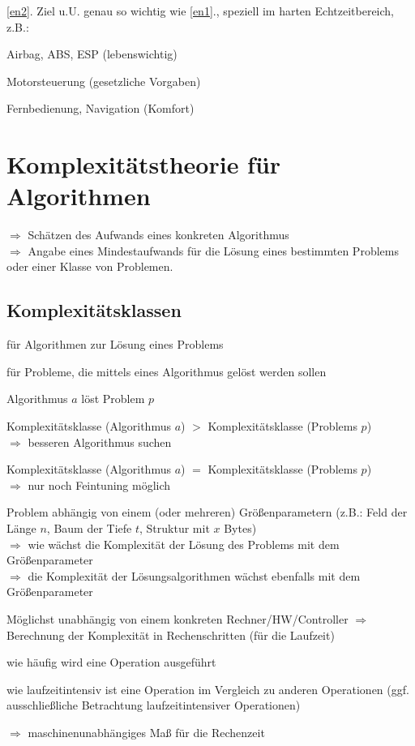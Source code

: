 \ref*{en2}. Ziel u.U. genau so wichtig wie \ref*{en1}., speziell im harten Echtzeitbereich, z.B.:
\begin{compactitem}
	\item Airbag, ABS, ESP (lebenswichtig)
	\item Motorsteuerung (gesetzliche Vorgaben)
	\item Fernbedienung, Navigation (Komfort)
\end{compactitem}

\section{Komplexitätstheorie für Algorithmen}
$\Rightarrow$ Schätzen des Aufwands eines konkreten Algorithmus\\
$\Rightarrow$ Angabe eines Mindestaufwands für die Lösung eines bestimmten Problems oder einer Klasse von Problemen.

\subsection{Komplexitätsklassen}
\begin{compactitem}
	\item für Algorithmen zur Lösung eines Problems
	\item für Probleme, die mittels eines Algorithmus gelöst werden sollen
\end{compactitem}

Algorithmus $a$ löst Problem $p$
\begin{compactitem}
	\item Komplexitätsklasse (Algorithmus $a$) $>$ Komplexitätsklasse (Problems $p$)\\
	$\Rightarrow$ besseren Algorithmus suchen
	\item Komplexitätsklasse (Algorithmus $a$) $=$ Komplexitätsklasse (Problems $p$)\\
	$\Rightarrow$ nur noch Feintuning möglich
\end{compactitem}

Problem abhängig von einem (oder mehreren) Größenparametern (z.B.: Feld der Länge $n$, Baum der Tiefe $t$, Struktur mit $x$ Bytes)\\
$\Rightarrow$ wie wächst die Komplexität der Lösung des Problems mit dem Größenparameter\\
$\Rightarrow$ die Komplexität der Lösungsalgorithmen wächst ebenfalls mit dem Größenparameter

Möglichst unabhängig von einem konkreten Rechner/HW/Controller
$\Rightarrow$ Berechnung der Komplexität in Rechenschritten (für die Laufzeit)
\begin{compactitem}
	\item wie häufig wird eine Operation ausgeführt
	\item wie laufzeitintensiv ist eine Operation im Vergleich zu anderen Operationen (ggf. ausschließliche Betrachtung laufzeitintensiver Operationen)
\end{compactitem}
$\Rightarrow$ maschinenunabhängiges Maß für die Rechenzeit

